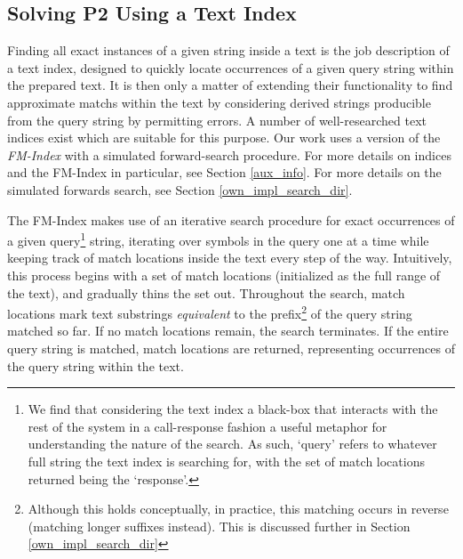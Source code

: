 \subsection{Solving P2 Using a Text Index} \label{P2text_index}

Finding all exact instances of a given string inside a \gls{text} is the job description of a \gls{text index}, designed to quickly locate occurrences of a given \gls{query} string within the prepared text. It is then only a matter of extending their functionality to find \glspl{approximate match} within the text by considering \glspl{derived string} producible from the query string by permitting \glspl{error}. A number of well-researched text indices exist which are suitable for this purpose. Our work uses a version of the \textit{FM-Index} with a simulated forward-search procedure. For more details on indices and the FM-Index in particular, see Section \ref{aux_info}. For more details on the simulated forwards search, see Section \ref{own_impl_search_dir}.
 
The FM-Index makes use of an iterative search procedure for exact occurrences of a given query\footnote{We find that considering the text index a black-box that interacts with the rest of the system in a call-response fashion a useful metaphor for understanding the nature of the search. As such, `query' refers to whatever full string the text index is searching for, with the set of match locations returned being the `response'.} string, iterating over symbols in the query one at a time while keeping track of \glspl{match location} inside the text every step of the way. Intuitively, this process begins with a set of match locations (initialized as the full range of the text), and gradually thins the set out. Throughout the search, match locations mark text substrings \textit{equivalent} to the prefix\footnote{Although this holds conceptually, in practice, this matching occurs in reverse (matching longer suffixes instead). This is discussed further in Section \ref{own_impl_search_dir}} of the query string matched so far. If no match locations remain, the search terminates. If the entire query string is matched, match locations are returned, representing occurrences of the query string within the text.
 

